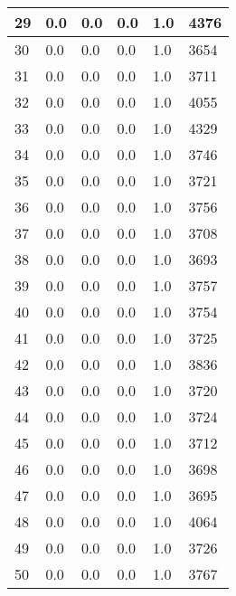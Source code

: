 \begin{longtable}{|l|l|l|l|l|l|}
29 & 0.0 & 0.0 & 0.0 & 1.0 & 4376 \\ \hline 
30 & 0.0 & 0.0 & 0.0 & 1.0 & 3654 \\ \hline 
31 & 0.0 & 0.0 & 0.0 & 1.0 & 3711 \\ \hline 
32 & 0.0 & 0.0 & 0.0 & 1.0 & 4055 \\ \hline 
33 & 0.0 & 0.0 & 0.0 & 1.0 & 4329 \\ \hline 
34 & 0.0 & 0.0 & 0.0 & 1.0 & 3746 \\ \hline 
35 & 0.0 & 0.0 & 0.0 & 1.0 & 3721 \\ \hline 
36 & 0.0 & 0.0 & 0.0 & 1.0 & 3756 \\ \hline 
37 & 0.0 & 0.0 & 0.0 & 1.0 & 3708 \\ \hline 
38 & 0.0 & 0.0 & 0.0 & 1.0 & 3693 \\ \hline 
39 & 0.0 & 0.0 & 0.0 & 1.0 & 3757 \\ \hline 
40 & 0.0 & 0.0 & 0.0 & 1.0 & 3754 \\ \hline 
41 & 0.0 & 0.0 & 0.0 & 1.0 & 3725 \\ \hline 
42 & 0.0 & 0.0 & 0.0 & 1.0 & 3836 \\ \hline 
43 & 0.0 & 0.0 & 0.0 & 1.0 & 3720 \\ \hline 
44 & 0.0 & 0.0 & 0.0 & 1.0 & 3724 \\ \hline 
45 & 0.0 & 0.0 & 0.0 & 1.0 & 3712 \\ \hline 
46 & 0.0 & 0.0 & 0.0 & 1.0 & 3698 \\ \hline 
47 & 0.0 & 0.0 & 0.0 & 1.0 & 3695 \\ \hline 
48 & 0.0 & 0.0 & 0.0 & 1.0 & 4064 \\ \hline 
49 & 0.0 & 0.0 & 0.0 & 1.0 & 3726 \\ \hline 
50 & 0.0 & 0.0 & 0.0 & 1.0 & 3767 \\ \hline 
\end{longtable}